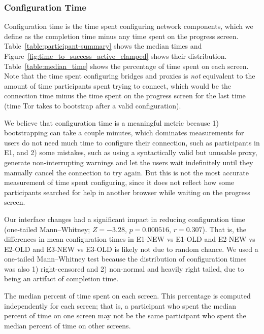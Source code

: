 \documentclass[USenglish,oneside,twocolumn]{article}
\begin{document}
\subsubsection{Configuration Time} 
Configuration time is the time spent configuring network components, which we define as the completion time minus any time spent on the progress screen. Table~\ref{table:participant-summary} shows the median times and Figure~\ref{fig:time_to_success_active_clamped} shows their distribution. Table~\ref{table:median_time} shows the percentage of time spent on each screen. Note that the time spent configuring bridges and proxies is {\it not} equivalent to the amount of time participants spent trying to connect, which would be the connection time minus the time spent on the progress screen for the last time (time Tor takes to bootstrap after a valid configuration). 

We believe that configuration time is a meaningful metric because 1) bootstrapping can take a couple minutes, which dominates measurements for users do not need much time to configure their connection, such as participants in E1, and 2) some mistakes, such as using a syntactically valid but unusable proxy, generate non-interrupting warnings and let the users wait indefinitely until they manually cancel the connection to try again. But this is not the most accurate measurement of time spent configuring, since it does not reflect how some participants searched for help in another browser while waiting on the progress screen.

Our interface changes had a significant impact in reducing configuration time (one-tailed Mann--Whitney; $Z = -3.28$, $p = 0.000516$, $r = 0.307$). That is, the differences in mean configuration times in E1-NEW vs E1-OLD and E2-NEW vs E2-OLD and E3-NEW vs E3-OLD is likely not due to random chance. We used a one-tailed Mann--Whitney test because the distribution of configuration times was also 1) right-censored and 2) non-normal and heavily right tailed, due to being an artifact of completion time. 

\begin{table}[t]
\centering

\caption{The median percent of time spent on each screen. 
This percentage is computed independently for each screen; that is, a participant who spent the median percent 
of time on one screen may not be the same participant who spent the median percent
of time on other screens.} 
\label{table:median_time}
\end{table}
\end{document}
